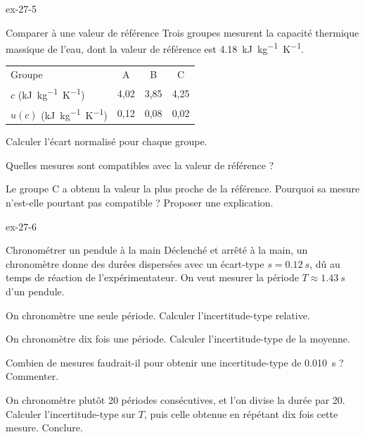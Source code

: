 \begin{blocLivre}{ex-27-5}
\begin{exercice}[1]{Comparer à une valeur de référence}
Trois groupes mesurent la capacité thermique massique de l'eau, dont la valeur de référence est
\qty{4,18}{kJ.kg^{-1}.K^{-1}}.
\begin{center}
\begin{tabular}{lccc}
\toprule
Groupe & A & B & C \\
$c$ (\unit{kJ.kg^{-1}.K^{-1}}) & 4,02 & 3,85 & 4,25 \\
$u(c)$ (\unit{kJ.kg^{-1}.K^{-1}}) & 0,12 & 0,08 & 0,02 \\
\bottomrule
\end{tabular}
\end{center}
\begin{questions}
\item Calculer l'écart normalisé pour chaque groupe.
\item Quelles mesures sont compatibles avec la valeur de référence ?
\item Le groupe C a obtenu la valeur la plus proche de la référence. Pourquoi sa mesure n'est-elle pourtant pas
compatible ? Proposer une explication.
\end{questions}
\end{exercice}
\end{blocLivre}
\begin{blocLivre}{ex-27-6}
\begin{exercice}[2]{Chronométrer un pendule à la main}
Déclenché et arrêté à la main, un chronomètre donne des durées dispersées avec un écart-type $s=\qty{0,12}{s}$, dû au temps
de réaction de l'expérimentateur. On veut mesurer la période $T\approx\qty{1,43}{s}$ d'un pendule.
\begin{questions}
\item On chronomètre une seule période. Calculer l'incertitude-type relative.
\item On chronomètre dix fois une période. Calculer l'incertitude-type de la moyenne.
\item Combien de mesures faudrait-il pour obtenir une incertitude-type de \qty{0,010}{s} ? Commenter.
\item On chronomètre plutôt 20 périodes consécutives, et l'on divise la durée par 20. Calculer l'incertitude-type sur $T$,
puis celle obtenue en répétant dix fois cette mesure. Conclure.
\end{questions}
\end{exercice}
\end{blocLivre}
